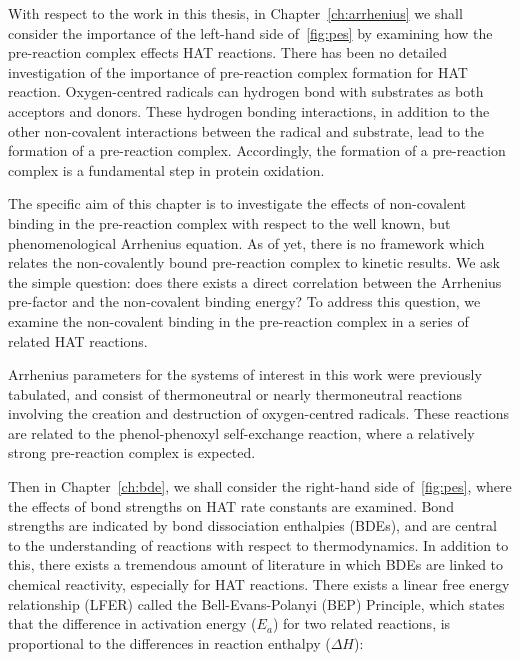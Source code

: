 With respect to the work in this thesis, in Chapter~\ref{ch:arrhenius} we shall consider the importance of the left-hand side of~\ref{fig:pes} by examining how the pre-reaction complex effects HAT reactions. There has been no detailed investigation of the importance of pre-reaction complex formation for HAT reaction. Oxygen-centred radicals can hydrogen bond with substrates as both acceptors and donors.\cite{Johnson2009a} These hydrogen bonding interactions, in addition to the other non-covalent interactions between the radical and substrate, lead to the formation of a pre-reaction complex. Accordingly, the formation of a pre-reaction complex is a fundamental step in protein oxidation.

The specific aim of this chapter is to investigate the effects of non-covalent binding in the pre-reaction complex with respect to the well known, but phenomenological Arrhenius equation. As of yet, there is no framework which relates the non-covalently bound pre-reaction complex to kinetic results. We ask the simple question: does there exists a direct correlation between the Arrhenius pre-factor and the non-covalent binding energy? To address this question, we examine the non-covalent binding in the pre-reaction complex in a series of related HAT reactions.

Arrhenius parameters for the systems of interest in this work were previously tabulated,\cite{DiLabio2005} and consist of thermoneutral or nearly thermoneutral reactions involving the creation and destruction of oxygen-centred radicals. These reactions are related to the phenol-phenoxyl self-exchange reaction, where a relatively strong pre-reaction complex is expected.

Then in Chapter~\ref{ch:bde}, we shall consider the right-hand side of~\ref{fig:pes}, where the effects of bond strengths on HAT rate constants are examined. Bond strengths are indicated by bond dissociation enthalpies (BDEs), and are central to the understanding of reactions with respect to thermodynamics. In addition to this, there exists a tremendous amount of literature in which BDEs are linked to chemical reactivity, especially for HAT reactions.\cite{Kochi1973, Tedder1982, Wijtmans2003, Pratt2004, Mayer2004} There exists a linear free energy relationship (LFER) called the Bell-Evans-Polanyi (BEP) Principle,\cite{Bell1936,Evans1938} which states that the difference in activation energy ($E_a$) for two related reactions, is proportional to the differences in reaction enthalpy ($\Delta H$):

